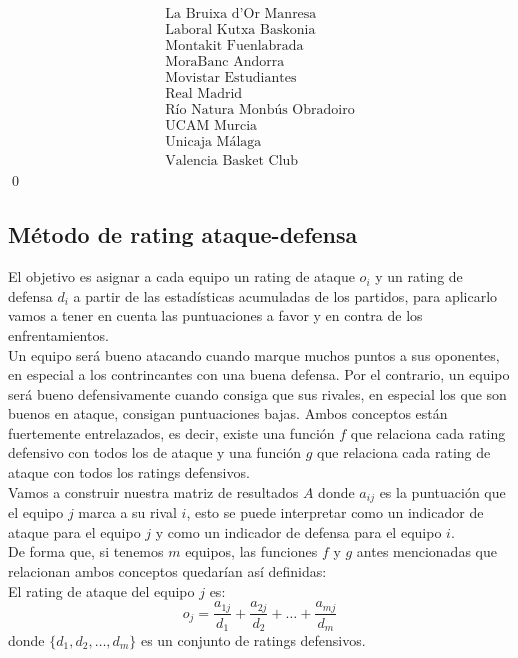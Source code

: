 \[\begin{array}{ccc}
\begin{array}{c}
	\text{La Bruixa d'Or Manresa} \\
	\text{Laboral Kutxa Baskonia} \\
	\text{Montakit Fuenlabrada} \\
	\text{MoraBanc Andorra} \\
	\text{Movistar Estudiantes} \\
	\text{Real Madrid} \\
	\text{Río Natura Monbús Obradoiro} \\
	\text{UCAM Murcia} \\
	\text{Unicaja Málaga} \\
	\text{Valencia Basket Club}
	\end{array}
	\end{array}
	\]
\qed


\subsection{Método de rating ataque-defensa}
El objetivo es asignar a cada equipo un rating de ataque $ o_{i} $ y un rating de defensa $d_{i}$ a partir de las estadísticas acumuladas de los partidos, para aplicarlo vamos a tener en cuenta las puntuaciones a favor y en contra de los enfrentamientos.\\

Un equipo será bueno atacando cuando marque muchos puntos a sus oponentes, en especial a los contrincantes con una buena defensa. Por el contrario, un equipo será bueno defensivamente cuando consiga que sus rivales, en especial los que son buenos en ataque, consigan puntuaciones bajas. Ambos conceptos están fuertemente entrelazados, es decir, existe una función $f$ que relaciona cada rating defensivo con todos los de ataque y una función $g$ que relaciona cada rating de ataque con todos los ratings defensivos.\\

Vamos a construir nuestra matriz de resultados $A$ donde $a_{ij}$ es la puntuación que el equipo $j$ marca a su rival $i$, esto se puede interpretar como un indicador de ataque para el equipo $j$ y como un indicador de defensa para el equipo $i$.\\

De forma que, si tenemos $m$ equipos, las funciones $f$ y $g$ antes mencionadas que relacionan ambos conceptos quedarían así definidas:\\ 

El rating de ataque del equipo $j$ es:
\begin{equation}
o_{j} = \dfrac{a_{1j}}{d_{1}} + \dfrac{a_{2j}}{d_{2}} + \dots + \dfrac{a_{mj}}{d_{m}}  \label{ofens}
\end{equation} 
donde $\{d_{1},d_{2}, \dots ,d_{m}\}$ es un conjunto de ratings defensivos.\\

